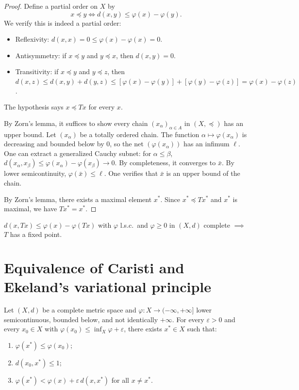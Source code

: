 \begin{proof}
Define a partial order on $X$ by
\[
    x \preceq y \iff d(x, y) \leq \varphi(x) - \varphi(y).
\]
We verify this is indeed a partial order:
\begin{itemize}
    \item Reflexivity: $d(x,x) = 0 \leq \varphi(x) - \varphi(x) = 0$.
    \item Antisymmetry: if $x \preceq y$ and $y \preceq x$, then $d(x,y) = 0$.
    \item Transitivity: if $x \preceq y$ and $y \preceq z$, then
          $d(x,z) \leq d(x,y) + d(y,z) \leq [\varphi(x) - \varphi(y)] + [\varphi(y) - \varphi(z)] = \varphi(x) - \varphi(z)$.
\end{itemize}

The hypothesis says $x \preceq Tx$ for every $x$.

By Zorn's lemma, it suffices to show every chain $(x_\alpha)_{\alpha \in A}$ in
$(X, \preceq)$ has an upper bound. Let $(x_\alpha)$ be a totally ordered chain.
The function $\alpha \mapsto \varphi(x_\alpha)$ is decreasing and bounded below
by $0$, so the net $(\varphi(x_\alpha))$ has an infimum $\ell$. One can extract
a generalized Cauchy subnet: for $\alpha \leq \beta$,
$d(x_\alpha, x_\beta) \leq \varphi(x_\alpha) - \varphi(x_\beta) \to 0$.
By completeness, it converges to $\bar{x}$. By lower semicontinuity,
$\varphi(\bar{x}) \leq \ell$. One verifies that $\bar{x}$ is an upper bound of
the chain.

By Zorn's lemma, there exists a maximal element $x^*$. Since $x^* \preceq Tx^*$
and $x^*$ is maximal, we have $Tx^* = x^*$.
\end{proof}

\begin{keyformulas}[title=\textbf{Caristi's condition}]
$d(x, Tx) \leq \varphi(x) - \varphi(Tx)$ with $\varphi$ l.s.c.\ and
$\varphi \geq 0$ in $(X, d)$ complete $\implies$ $T$ has a fixed point.
\end{keyformulas}

\section{Equivalence of Caristi and Ekeland's variational principle}

\begin{theorem}
Let $(X, d)$ be a complete metric space and $\varphi : X \to (-\infty, +\infty]$
lower semicontinuous, bounded below, and not identically $+\infty$. For every
$\varepsilon > 0$ and every $x_0 \in X$ with
$\varphi(x_0) \leq \inf_X \varphi + \varepsilon$, there exists $x^* \in X$
such that:
\begin{enumerate}
    \item $\varphi(x^*) \leq \varphi(x_0)$;
    \item $d(x_0, x^*) \leq 1$;
    \item $\varphi(x^*) < \varphi(x) + \varepsilon \, d(x, x^*)$ for all $x \neq x^*$.
\end{enumerate}
\end{theorem}

